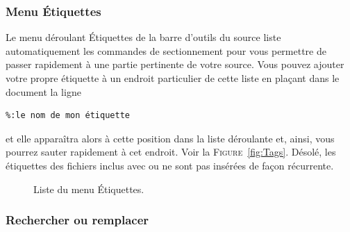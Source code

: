 \documentclass[11pt,french]{article}
\newcommand{\mnu}[1]{\textsf{#1}}
\begin{document}
\subsubsection{Menu Étiquettes}

Le menu déroulant \mnu{Étiquettes} de la barre d'outils du source liste automatiquement les commandes de sectionnement pour vous permettre de passer rapidement à une partie pertinente de votre source. Vous pouvez ajouter votre propre étiquette à un endroit particulier de cette liste en plaçant dans le document la ligne
\begin{verbatim}
%:le nom de mon étiquette
\end{verbatim}
et elle apparaîtra alors à cette position dans la liste déroulante et, ainsi, vous pourrez sauter rapidement à cet endroit. Voir la \textsc{Figure}~\vref{fig:Tags}. Désolé, les étiquettes des fichiers inclus avec \verb|| ou \verb|| ne sont pas insérées de façon récurrente.

\begin{figure}
\centering
{}
\caption{Liste du menu Étiquettes.\label{fig:Tags}}
\end{figure}

\subsubsection{Rechercher ou remplacer}
\end{document}
